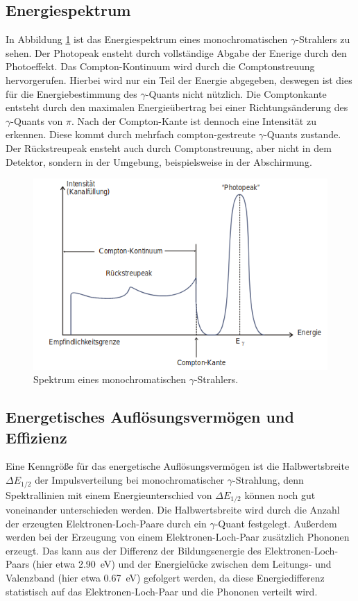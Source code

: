 \subsection{Energiespektrum}
In Abbildung \ref{abb:4} ist das Energiespektrum eines monochromatischen
$\gamma$-Strahlers zu sehen. Der Photopeak ensteht durch vollständige Abgabe der Enerige
durch den Photoeffekt.
Das Compton-Kontinuum wird durch die Comptonstreuung hervorgerufen.
Hierbei wird nur ein Teil der Energie abgegeben, deswegen ist dies für die
Energiebestimmung des $\gamma$-Quants nicht nützlich. Die Comptonkante entsteht durch
den maximalen Energieübertrag bei einer Richtungsänderung des $\gamma$-Quants von $\pi$.
Nach der Compton-Kante ist dennoch eine Intensität zu erkennen. Diese kommt
durch mehrfach compton-gestreute $\gamma$-Quants zustande.
Der Rückstreupeak ensteht auch durch Comptonstreuung, aber
nicht in dem Detektor, sondern in der Umgebung, beispielsweise in der
Abschirmung.

\begin{figure}
  \centering
  \includegraphics[scale=0.5]{Spektrum.png}
  \caption{Spektrum eines monochromatischen $\gamma$-Strahlers. \cite{Q1}}
  \label{abb:4}
\end{figure}

\subsection{Energetisches Auflösungsvermögen und Effizienz}

Eine Kenngröße für das energetische Auflösungsvermögen ist die Halbwertsbreite
$\Delta E_{1/2}$ der Impulsverteilung bei monochromatischer $\gamma$-Strahlung,
denn Spektrallinien mit einem Energieunterschied von $\Delta E_{1/2}$
können noch gut voneinander unterschieden werden.
Die Halbwertsbreite wird durch die Anzahl der erzeugten
Elektronen-Loch-Paare durch ein $\gamma$-Quant festgelegt.
Außerdem werden bei der Erzeugung von einem Elektronen-Loch-Paar zusätzlich
Phononen erzeugt. Das kann aus der Differenz der Bildungsenergie des
Elektronen-Loch-Paars (hier etwa \SI{2,90}{\eV}) und der Energielücke zwischen
dem Leitungs- und Valenzband (hier etwa \SI{0,67}{\eV}) gefolgert werden, da
diese Energiedifferenz statistisch auf das Elektronen-Loch-Paar und die Phononen
verteilt wird.

